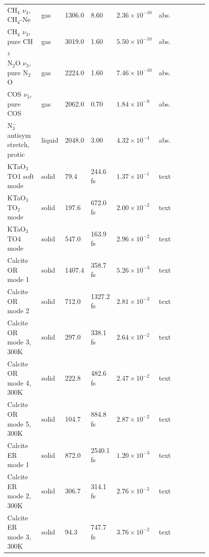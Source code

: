 \begin{table}[htbp]
\begin{tabular}{@{}p{0.17\linewidth}p{0.05\linewidth}p{0.08\linewidth}p{0.10\linewidth}p{0.185\linewidth}p{0.075\linewidth}p{0.16\linewidth}@{}}
CH$_4$ \(\nu_4\), CH$_4$-Ne & gas & 1306.0 & 8.60 & \(2.36\!\times\!10^{-10}\) & abs. & \citep{ch4vt} \\
CH$_4$ \(\nu_3\), pure CH$_4$ & gas & 3019.0 & 1.60 & \(5.50\!\times\!10^{-10}\) & abs. & \citep{cottrell1966} \\
N$_2$O \(\nu_3\), pure N$_2$O & gas & 2224.0 & 1.60 & \(7.46\!\times\!10^{-10}\) & abs. & \citep{cottrell1966} \\
COS \(\nu_3\), pure COS & gas & 2062.0 & 0.70 & \(1.84\!\times\!10^{-9}\) & abs. & \citep{cottrell1966} \\
N$_3^-$ antisym stretch, protic & liquid & 2048.0 & 3.00 & \(4.32\!\times\!10^{-4}\) & abs. & \citep{owrutsky1991} \\
KTaO$_3$ TO1 soft mode & solid & 79.4 & 244.6 fs & \(1.37\!\times\!10^{-1}\) & text & \citep{mori2026} \\
KTaO$_3$ TO$_2$ mode & solid & 197.6 & 672.0 fs & \(2.00\!\times\!10^{-2}\) & text & \citep{mori2026} \\
KTaO$_3$ TO4 mode & solid & 547.0 & 163.9 fs & \(2.96\!\times\!10^{-2}\) & text & \citep{mori2026} \\
Calcite OR mode 1 & solid & 1407.4 & 358.7 fs & \(5.26\!\times\!10^{-3}\) & text & \citep{posch2007} \\
Calcite OR mode 2 & solid & 712.0 & 1327.2 fs & \(2.81\!\times\!10^{-3}\) & text & \citep{posch2007} \\
Calcite OR mode 3, 300K & solid & 297.0 & 338.1 fs & \(2.64\!\times\!10^{-2}\) & text & \citep{posch2007} \\
Calcite OR mode 4, 300K & solid & 222.8 & 482.6 fs & \(2.47\!\times\!10^{-2}\) & text & \citep{posch2007} \\
Calcite OR mode 5, 300K & solid & 104.7 & 884.8 fs & \(2.87\!\times\!10^{-2}\) & text & \citep{posch2007} \\
Calcite ER mode 1 & solid & 872.0 & 2540.1 fs & \(1.20\!\times\!10^{-3}\) & text & \citep{posch2007} \\
Calcite ER mode 2, 300K & solid & 306.7 & 314.1 fs & \(2.76\!\times\!10^{-2}\) & text & \citep{posch2007} \\
Calcite ER mode 3, 300K & solid & 94.3 & 747.7 fs & \(3.76\!\times\!10^{-2}\) & text & \citep{posch2007} \\
\bottomrule
\end{tabular}

\end{table}
